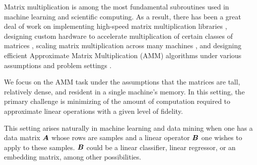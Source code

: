 
Matrix multiplication is among the most fundamental subroutines used in machine learning and scientific computing. As a result, there has been a great deal of work on implementing high-speed matrix multiplication libraries \cite{pytorch,eigen,tensorflow}, designing custom hardware to accelerate multiplication of certain classes of matrices \cite{eie,eyeriss,scnn,tpu}, scaling matrix multiplication across many machines \cite{distributedCoded, shortDot, entangledPolynomial, matmulCommunicationBounds}, and designing efficient Approximate Matrix Multiplication (AMM) algorithms under various assumptions and problem settings \cite{drineas_fast_2006,manne_fast_2014,ye_frequent_2016,mroueh_co-occuring_2016,bolt}.

We focus on the AMM task under the assumptions that the matrices are tall,
relatively dense,
and resident in a single machine's memory. In this setting, the primary challenge is minimizing of the amount of computation required to approximate linear operations with a given level of fidelity.

This setting arises naturally in machine learning and data mining when one has a data matrix $\bm{A}$ whose rows are samples and a linear operator $\bm{B}$ one wishes to apply to these samples. $\bm{B}$ could be a linear classifier, linear regressor, or an embedding matrix, among other possibilities.

